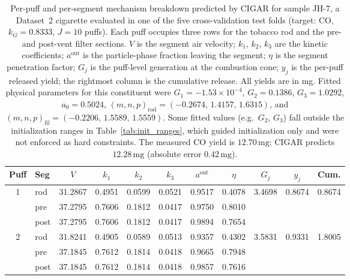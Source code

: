 \begin{table}[H]
    \centering
    \caption{Per-puff and per-segment mechanism breakdown predicted by
    CIGAR for sample JH-7, a Dataset~2 cigarette evaluated in one of
    the five cross-validation test folds (target: CO,
    $k_G = 0.8333$, $J = 10$ puffs). Each puff occupies three rows
    for the tobacco rod and the pre- and post-vent filter sections.
    $V$ is the segment air velocity; $k_1$, $k_2$, $k_3$ are the
    kinetic coefficients; $a^{\mathrm{out}}$ is the particle-phase
    fraction leaving the segment; $\eta$ is the segment penetration
    factor; $G_j$ is the puff-level generation at the combustion
    cone; $y_j$ is the per-puff released yield; the rightmost column
    is the cumulative release. All yields are in mg. Fitted physical
    parameters for this constituent were
    $G_1 = -1.53\!\times\!10^{-4}$, $G_2 = 0.1386$,
    $G_3 = 1.0292$, $a_0 = 0.5024$,
    $(m, n, p)_{\mathrm{rod}} = (-0.2674,\, 1.4157,\, 1.6315)$, and
    $(m, n, p)_{\mathrm{fil}} = (-0.2206,\, 1.5589,\, 1.5559)$.
    Some fitted values (e.g.\ $G_2$, $G_3$) fall outside the
    initialization ranges in Table~\ref{tab:init_ranges}, which guided
    initialization only and were not enforced as hard constraints. The
    measured CO yield is $12.70\,\mathrm{mg}$; CIGAR predicts
    $12.28\,\mathrm{mg}$ (absolute error $0.42\,\mathrm{mg}$).}
    \label{tab:mechanism_breakdown}
    \footnotesize
    \setlength{\tabcolsep}{3pt}
    \begin{tabular}{c l c c c c c c c c c}
        \toprule
        Puff & Seg & $V$ & $k_1$ & $k_2$ & $k_3$ & $a^{\mathrm{out}}$ & $\eta$ & $G_j$ & $y_j$ & Cum. \\
        \midrule
        \multirow{3}{*}{1}  & rod  & 31.2867 & 0.4951 & 0.0599 & 0.0521 & 0.9517 & 0.4078 & 3.4698 & 0.8674 & 0.8674 \\
                            & pre  & 37.2795 & 0.7606 & 0.1812 & 0.0417 & 0.9750 & 0.8010 &        &        &        \\
                            & post & 37.2795 & 0.7606 & 0.1812 & 0.0417 & 0.9894 & 0.7654 &        &        &        \\
        \midrule
        \multirow{3}{*}{2}  & rod  & 31.8241 & 0.4905 & 0.0589 & 0.0513 & 0.9357 & 0.4302 & 3.5831 & 0.9331 & 1.8005 \\
                            & pre  & 37.1845 & 0.7612 & 0.1814 & 0.0418 & 0.9665 & 0.7948 &        &        &        \\
                            & post & 37.1845 & 0.7612 & 0.1814 & 0.0418 & 0.9857 & 0.7616 &        &        &        \\

\end{tabular}
\end{table}
